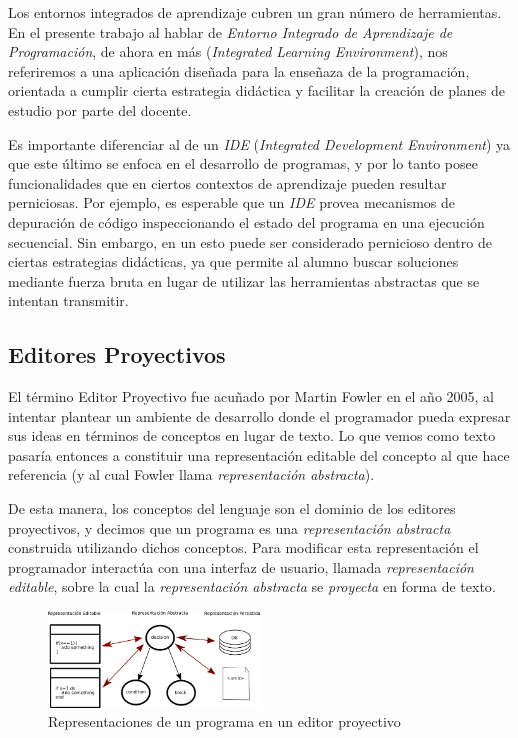 Los entornos integrados de aprendizaje\cite{IntegratedLearningEnvironment} cubren un gran número de herramientas. En el presente trabajo al hablar de \textit{Entorno Integrado de Aprendizaje de Programación}, de ahora en más \ile (\textit{Integrated Learning Environment}), nos referiremos a una aplicación diseñada para la enseñaza de la programación, orientada a cumplir cierta estrategia didáctica y facilitar la creación de planes de estudio por parte del docente. 

Es importante diferenciar al \ile de un \textit{IDE} (\textit{Integrated Development Environment}) ya que este último se enfoca en el desarrollo de programas, y por lo tanto posee funcionalidades que en ciertos contextos de aprendizaje pueden resultar perniciosas. Por ejemplo, es esperable que un \textit{IDE} provea mecanismos de depuración de código inspeccionando el estado del programa en una ejecución secuencial. Sin embargo, en un \ile esto puede ser considerado pernicioso dentro de ciertas estrategias didácticas, ya que permite al alumno buscar soluciones mediante fuerza bruta en lugar de utilizar las herramientas abstractas que se intentan transmitir.

\subsection{Editores Proyectivos}

El término Editor Proyectivo fue acuñado por Martin Fowler en el año 2005\cite{Fowler}, al intentar plantear un ambiente de desarrollo donde el programador pueda expresar sus ideas en términos de conceptos en lugar de texto. Lo que vemos como texto pasaría entonces a constituir una representación editable del concepto al que hace referencia (y al cual Fowler llama \textit{representación abstracta}).

De esta manera, los conceptos del lenguaje son el dominio de los editores proyectivos, y decimos que un programa es una \textit{representación abstracta} construida utilizando dichos conceptos. Para modificar esta representación el programador interactúa con una interfaz de usuario, llamada \textit{representación editable}, sobre la cual la \textit{representación abstracta} se \textit{proyecta} en forma de texto\cite{voelter2014projectional}. 

\begin{figure}
  \begin{center}
    \includegraphics[width=0.5\textwidth,keepaspectratio]{assets/projectional-editor.png}
    \caption{Representaciones de un programa en un editor proyectivo}
  \end{center}
\end{figure}

